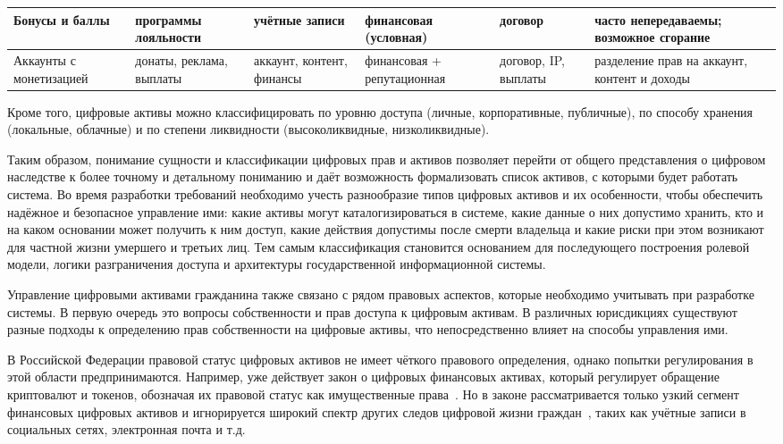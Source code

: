 \begin{landscape}
{\begin{longtable}{|P{2.7cm}|P{3.1cm}|P{2.35cm}|P{2.7cm}|P{6.2cm}|P{6.45cm}|}
Бонусы и баллы &
программы лояльности &
учётные записи &
финансовая (условная) &
договор &
часто непередаваемы; возможное сгорание \\
\hline

Аккаунты с монетизацией &
донаты, реклама, выплаты &
аккаунт, контент, финансы &
финансовая + репутационная &
договор, IP, выплаты &
разделение прав на аккаунт, контент и доходы \\
\hline

\end{longtable}
}
\end{landscape}
\clearpage
\normalsize

Кроме того, цифровые активы можно классифицировать по уровню доступа (личные, корпоративные, публичные), по способу хранения (локальные, облачные) и по степени ликвидности (высоколиквидные, низколиквидные).

Таким образом, понимание сущности и классификации цифровых прав и активов позволяет перейти от общего представления о цифровом наследстве к более точному и детальному пониманию и даёт возможность формализовать список активов, с которыми будет работать система. Во время разработки требований необходимо учесть разнообразие типов цифровых активов и их особенности, чтобы обеспечить надёжное и безопасное управление ими: какие активы могут каталогизироваться в системе, какие данные о них допустимо хранить, кто и на каком основании может получить к ним доступ, какие действия допустимы после смерти владельца и какие риски при этом возникают для частной жизни умершего и третьих лиц. Тем самым классификация становится основанием для последующего построения ролевой модели, логики разграничения доступа и архитектуры государственной информационной системы.

Управление цифровыми активами гражданина также связано с рядом правовых аспектов, которые необходимо учитывать при разработке системы. В первую очередь это вопросы собственности и прав доступа к цифровым активам. В различных юрисдикциях существуют разные подходы к определению прав собственности на цифровые активы, что непосредственно влияет на способы управления ими.

В Российской Федерации правовой статус цифровых активов не имеет чёткого правового определения, однако попытки регулирования в этой области предпринимаются. Например, уже действует закон о цифровых финансовых активах, который регулирует обращение криптовалют и токенов, обозначая их правовой статус как имущественные права~\cite{federalLaw259FZ_2020}. Но в законе рассматривается только узкий сегмент финансовых цифровых активов и игнорируется широкий спектр других следов цифровой жизни граждан~\cite{Orlov2024Moluch}, таких как учётные записи в социальных сетях, электронная почта и т.д.


